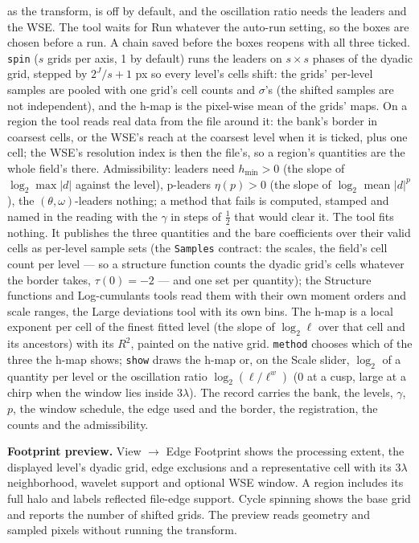 \documentclass[10pt]{article}
\begin{document}
as the transform, is off by default, and the oscillation ratio needs the leaders and the WSE. The
tool waits for Run whatever the auto-run setting, so the boxes are chosen before a run. A chain saved
before the boxes reopens with all three ticked. \texttt{spin} ($s$ grids per axis, 1 by default)
runs the leaders on $s \times s$ phases of the dyadic grid, stepped by $2^J/s + 1$ px so every
level's cells shift: the grids' per-level samples are pooled with one grid's cell counts and
$\sigma$'s (the shifted samples are not independent), and the h-map is the pixel-wise mean of the
grids' maps. On a region the tool reads real data from the file around it: the bank's border in
coarsest cells, or the WSE's reach at the coarsest level when it is ticked, plus one cell; the WSE's
resolution index is then the file's, so a region's quantities are the whole field's there.
Admissibility: leaders need $h_{\min} > 0$ (the slope of $\log_2 \max|d|$ against the level),
p-leaders $\eta(p) > 0$ (the slope of $\log_2$ mean $|d|^p$), the $(\theta,\omega)$-leaders
nothing; a method that fails is computed, stamped and named in the reading with the $\gamma$ in
steps of $\tfrac12$ that would clear it. The tool fits nothing. It publishes the three quantities
and the bare coefficients over their valid cells as per-level sample sets (the \texttt{Samples}
contract: the scales, the field's cell count per level --- so a structure function counts the
dyadic grid's cells whatever the border takes, $\tau(0) = -2$ --- and one set per quantity); the
Structure functions and Log-cumulants tools read them with their own moment orders and scale
ranges, the Large deviations tool with its own bins. The h-map is a local exponent per cell of the
finest fitted level (the slope of $\log_2 \ell$ over that cell and its ancestors) with its $R^2$,
painted on the native grid. \texttt{method} chooses which of the three the h-map shows;
\texttt{show} draws the h-map or, on the Scale slider, $\log_2$ of a quantity per level or the
oscillation ratio $\log_2(\ell/\ell^w)$ (0 at a cusp, large at a chirp when the window lies inside
$3\lambda$). The record carries the bank, the levels, $\gamma$, $p$, the window schedule, the
edge used and the border, the registration, the counts and the admissibility.

\textbf{Footprint preview.} View $\to$ Edge Footprint shows the processing extent, the displayed
level's dyadic grid, edge exclusions and a representative cell with its $3\lambda$ neighborhood,
wavelet support and optional WSE window. A region includes its full halo and labels reflected
file-edge support. Cycle spinning shows the base grid and reports the number of shifted grids.
The preview reads geometry and sampled pixels without running the transform.
\end{document}
